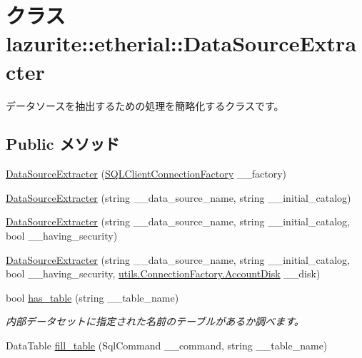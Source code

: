\hypertarget{classlazurite_1_1etherial_1_1_data_source_extracter}{
\section{クラス lazurite::etherial::DataSourceExtracter}
\label{classlazurite_1_1etherial_1_1_data_source_extracter}
}


データソースを抽出するための処理を簡略化するクラスです。  
\subsection*{Public メソッド}
\begin{DoxyCompactItemize}
\item 
\hyperlink{classlazurite_1_1etherial_1_1_data_source_extracter_a033223da89e7b0b10b7031c938d0b95b}{DataSourceExtracter} (\hyperlink{classlazurite_1_1etherial_1_1_s_q_l_client_connection_factory}{SQLClientConnectionFactory} \_\-\_\-factory)
\item 
\hyperlink{classlazurite_1_1etherial_1_1_data_source_extracter_a75d47e54958726baabc202baf94a2802}{DataSourceExtracter} (string \_\-\_\-data\_\-source\_\-name, string \_\-\_\-initial\_\-catalog)
\item 
\hyperlink{classlazurite_1_1etherial_1_1_data_source_extracter_a558e771fb5f79119dfcb8244e87d95d4}{DataSourceExtracter} (string \_\-\_\-data\_\-source\_\-name, string \_\-\_\-initial\_\-catalog, bool \_\-\_\-having\_\-security)
\item 
\hyperlink{classlazurite_1_1etherial_1_1_data_source_extracter_ace9948cf233a8af306d4c64345bdd832}{DataSourceExtracter} (string \_\-\_\-data\_\-source\_\-name, string \_\-\_\-initial\_\-catalog, bool \_\-\_\-having\_\-security, \hyperlink{classlazurite_1_1etherial_1_1utils_1_1_connection_factory_1_1_account_disk}{utils.ConnectionFactory.AccountDisk} \_\-\_\-disk)
\item 
bool \hyperlink{classlazurite_1_1etherial_1_1_data_source_extracter_aa440ff94bdb3001c3638def8143ed083}{has\_\-table} (string \_\-\_\-table\_\-name)
\begin{DoxyCompactList}\small\item\em 内部データセットに指定された名前のテーブルがあるか調べます。 \item\end{DoxyCompactList}\item 
DataTable \hyperlink{classlazurite_1_1etherial_1_1_data_source_extracter_a16e3cad62b7d0db5e84ad7656e025e2a}{fill\_\-table} (SqlCommand \_\-\_\-command, string \_\-\_\-table\_\-name)

\end{DoxyCompactItemize}
